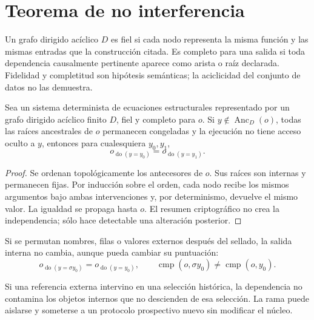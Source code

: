 \section{Teorema de no interferencia}
\label{sec:teorema-no-interferencia}

\begin{definition}
\label{def:dag-fiel-completo}
Un grafo dirigido acíclico \(D\) es fiel si cada nodo representa la misma
función y las mismas entradas que la construcción citada. Es completo para
una salida si toda dependencia causalmente pertinente aparece como arista o
raíz declarada. Fidelidad y completitud son hipótesis semánticas; la
aciclicidad del conjunto de datos no las demuestra.
\end{definition}

\begin{theorem}
\label{thm:no-interferencia-prospectiva}
Sea un sistema determinista de ecuaciones estructurales representado por un
grafo dirigido acíclico finito \(D\), fiel y completo para \(o\). Si
\(y\notin\operatorname{Anc}_D(o)\), todas las raíces ancestrales de \(o\)
permanecen congeladas y la ejecución no tiene acceso oculto a \(y\), entonces
para cualesquiera \(y_0,y_1\),
\[
 o_{\operatorname{do}(y=y_0)}
 =o_{\operatorname{do}(y=y_1)}.
\]
\end{theorem}

\begin{proof}
Se ordenan topológicamente los antecesores de \(o\). Sus raíces son internas
y permanecen fijas. Por inducción sobre el orden, cada nodo recibe los mismos
argumentos bajo ambas intervenciones y, por determinismo, devuelve el mismo
valor. La igualdad se propaga hasta \(o\). El resumen criptográfico no crea
la independencia; sólo hace detectable una alteración posterior.
\end{proof}

\begin{corollary}
\label{cor:permutacion-comparacion-externa}
Si se permutan nombres, filas o valores externos después del sellado, la
salida interna no cambia, aunque pueda cambiar su puntuación:
\[
 o_{\operatorname{do}(y=\sigma y_0)}
 =o_{\operatorname{do}(y=y_0)},\qquad
 \operatorname{cmp}(o,\sigma y_0)
 \ne\operatorname{cmp}(o,y_0).
\]
\end{corollary}

\begin{proposition}
\label{prop:separacion-ramas-calibradas}
Si una referencia externa intervino en una selección histórica, la
dependencia no contamina los objetos internos que no descienden de esa
selección. La rama puede aislarse y someterse a un protocolo prospectivo
nuevo sin modificar el núcleo.
\end{proposition}

